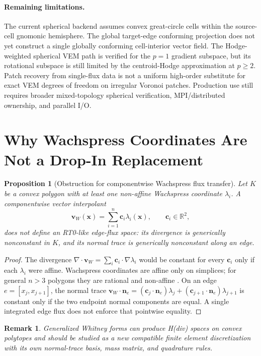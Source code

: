 \documentclass[11pt]{article}
\newcommand{\x}{\mathbf{x}}
\newcommand{\n}{\mathbf{n}}
\newcommand{\R}{\mathbb{R}}
\newtheorem{proposition}{Proposition}
\newtheorem{remark}{Remark}
\begin{document}
\paragraph{Remaining limitations.}
The current spherical backend assumes convex great-circle cells within the
source-cell gnomonic hemisphere.  The global target-edge conforming projection
does not yet construct a single globally conforming cell-interior vector field.
The Hodge-weighted spherical VEM path is verified for the \(p=1\) gradient
subspace, but its rotational subspace is still limited by the centroid-Hodge
approximation at \(p\ge2\).  Patch recovery from single-flux data is not a
uniform high-order substitute for exact VEM degrees of freedom on irregular
Voronoi patches.  Production use still requires broader mixed-topology
spherical verification, MPI/distributed ownership, and parallel I/O.

\appendix

\section{Why Wachspress Coordinates Are Not a Drop-In Replacement}
\label{app:wachspress}

\begin{proposition}[Obstruction for componentwise Wachspress flux transfer]
Let \(K\) be a convex polygon with at least one non-affine Wachspress coordinate
\(\lambda_i\).  A componentwise vector interpolant
\[
  \mathbf{v}_W(\x)=\sum_{i=1}^{n}\mathbf{c}_i\lambda_i(\x),
  \qquad \mathbf{c}_i\in\R^2,
\]
does not define an RT0-like edge-flux space: its divergence is generically
nonconstant in \(K\), and its normal trace is generically nonconstant along an
edge.
\end{proposition}

\begin{proof}
The divergence \(\nabla\cdot\mathbf{v}_W = \sum_i \mathbf{c}_i\cdot\nabla\lambda_i\)
would be constant for every \(\mathbf{c}_i\) only if each \(\lambda_i\) were
affine.  Wachspress coordinates are affine only on simplices; for general \(n>3\)
polygons they are rational and non-affine
\cite{Wachspress1975,FloaterHormannKos2006}.  On an edge \(e=[x_j,x_{j+1}]\),
the normal trace
\(\mathbf{v}_W\cdot\n_e = (\mathbf{c}_j\cdot\n_e)\lambda_j +
(\mathbf{c}_{j+1}\cdot\n_e)\lambda_{j+1}\) is constant only if the two endpoint
normal components are equal.  A single integrated edge flux does not enforce
that pointwise equality.
\end{proof}

\begin{remark}
Generalized Whitney forms can produce H(div) spaces on convex polytopes
\cite{GilletteRandBajaj2016} and should be studied as a new compatible finite
element discretization with its own normal-trace basis, mass matrix, and
quadrature rules.
\end{remark}



\end{document}
